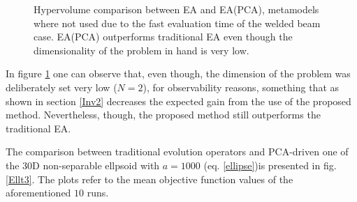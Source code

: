 \begin{figure}[h!]
\begin{minipage}[b]{1\linewidth}
 \centering
\end{minipage}
\caption{Hypervolume comparison between EA and EA(PCA), metamodels where not used due to the fast evaluation time of the welded beam case. EA(PCA) outperforms traditional EA even though the dimensionality of the problem in hand is very low.} 
\label{HypervolumeComparison}
\end{figure}

In figure \ref{HypervolumeComparison} one can observe that, even though, the dimension of the problem was deliberately set very low ($N=2$), for observability reasons, something that as shown in section \ref{Inv2} decreases the expected gain from the use of the proposed method. Nevertheless, though, the proposed method still outperforms the traditional EA.  

The comparison between traditional evolution operators and PCA-driven one of the 30D non-separable ellpsoid with $a=1000$ (eq. \ref{ellipse})is presented in fig. \ref{Ellt3}. The plots refer to the mean objective function values of the aforementioned $10$ runs. 

